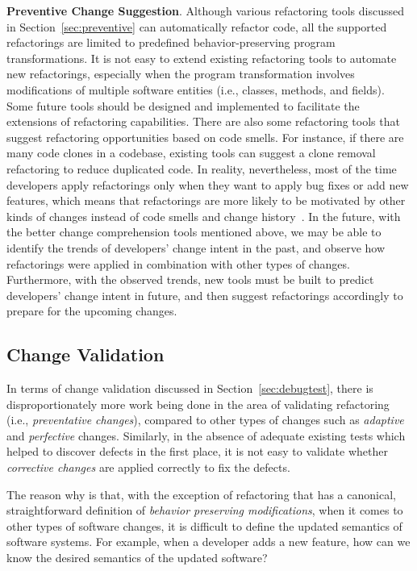 \textbf{Preventive Change Suggestion}.
Although various refactoring tools discussed in Section~\ref{sec:preventive} can automatically refactor code, all the supported refactorings are limited to predefined behavior-preserving program transformations. It is not easy to extend existing refactoring tools to automate new refactorings, especially when the program transformation involves modifications of multiple software entities (i.e., classes, methods, and fields). Some future tools should be designed and implemented to facilitate the extensions of refactoring capabilities.
There are also some refactoring tools that suggest refactoring opportunities based on code smells. For instance, if there are many code clones in a codebase, existing tools can suggest a clone removal refactoring to reduce duplicated code. In reality, nevertheless, most of the time developers apply refactorings only when they want to apply bug fixes or add new features, which means that refactorings are more likely to be motivated by other kinds of changes instead of code smells and change history~\cite{Silva2016:WWR}. In the future, with the better change comprehension tools mentioned above, we may be able to identify the trends of developers' change intent in the past, and observe how refactorings were applied in combination with other types of changes. Furthermore, with the observed trends, new tools must be built to predict developers' change intent in future, and then suggest refactorings accordingly to prepare for the upcoming changes.


\subsection{Change Validation}
In terms of change validation discussed in Section~\ref{sec:debugtest}, there is disproportionately more work being done in the area of validating refactoring (i.e., {\em preventative changes}), compared to other types of changes such as {\em adaptive} and {\em perfective} changes. Similarly, in the absence of adequate existing tests which helped to discover defects in the first place, it is not easy to validate whether {\em corrective changes} are applied correctly to fix the defects. 

The reason why is that, with the exception of refactoring that has a canonical, straightforward definition of {\em behavior preserving modifications}, when it comes to other types of software changes, it is difficult to define the updated semantics of software systems. For example, when a developer adds a new feature, how can we know the desired semantics of the updated software?

